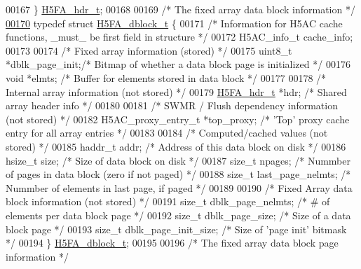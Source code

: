 \begin{DoxyCode}
00167 \} \hyperlink{struct_h5_f_a__hdr__t}{H5FA\_hdr\_t};
00168 
00169 \textcolor{comment}{/* The fixed array data block information */}
\hyperlink{struct_h5_f_a__dblock__t}{00170} \textcolor{keyword}{typedef} \textcolor{keyword}{struct }\hyperlink{struct_h5_f_a__dblock__t}{H5FA\_dblock\_t} \{
00171     \textcolor{comment}{/* Information for H5AC cache functions, \_must\_ be first field in structure */}
00172     H5AC\_info\_t cache\_info;
00173 
00174     \textcolor{comment}{/* Fixed array information (stored) */}
00175     uint8\_t     *dblk\_page\_init;\textcolor{comment}{/* Bitmap of whether a data block page is initialized       */}
00176     \textcolor{keywordtype}{void}        *elmts;         \textcolor{comment}{/* Buffer for elements stored in data block                 */}
00177 
00178     \textcolor{comment}{/* Internal array information (not stored) */}
00179     \hyperlink{struct_h5_f_a__hdr__t}{H5FA\_hdr\_t}    *hdr;            \textcolor{comment}{/* Shared array header info                              */}
00180 
00181     \textcolor{comment}{/* SWMR / Flush dependency information (not stored) */}
00182     H5AC\_proxy\_entry\_t *top\_proxy;      \textcolor{comment}{/* 'Top' proxy cache entry for all array entries */}
00183 
00184     \textcolor{comment}{/* Computed/cached values (not stored) */}
00185     haddr\_t     addr;               \textcolor{comment}{/* Address of this data block on disk                   */}
00186     hsize\_t     size;               \textcolor{comment}{/* Size of data block on disk                           */}
00187     \textcolor{keywordtype}{size\_t}      npages;             \textcolor{comment}{/* Nummber of pages in data block (zero if not paged)   */}
00188     \textcolor{keywordtype}{size\_t}      last\_page\_nelmts;   \textcolor{comment}{/* Nummber of elements in last page, if paged           */}
00189 
00190     \textcolor{comment}{/* Fixed Array data block information (not stored) */}
00191     \textcolor{keywordtype}{size\_t} dblk\_page\_nelmts;        \textcolor{comment}{/* # of elements per data block page                    */}
00192     \textcolor{keywordtype}{size\_t} dblk\_page\_size;          \textcolor{comment}{/* Size of a data block page                            */}
00193     \textcolor{keywordtype}{size\_t} dblk\_page\_init\_size;     \textcolor{comment}{/* Size of 'page init' bitmask                          */}
00194 \} \hyperlink{struct_h5_f_a__dblock__t}{H5FA\_dblock\_t};
00195 
00196 \textcolor{comment}{/* The fixed array data block page information */}

\end{DoxyCode}
